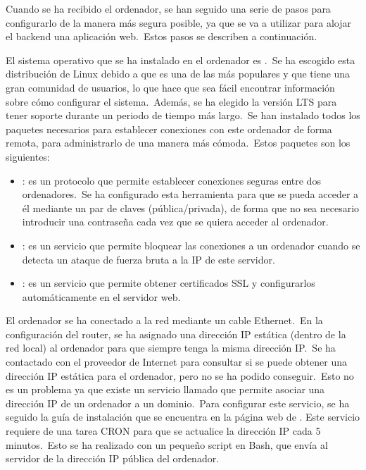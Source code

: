 Cuando se ha recibido el ordenador, se han seguido una serie de pasos para configurarlo de la manera más segura posible,
ya que se va a utilizar para alojar el backend una aplicación web.\ Estos pasos se describen a continuación.

El sistema operativo que se ha instalado en el ordenador es .\ Se ha escogido esta
distribución de Linux debido a que es una de las más populares y que tiene una gran comunidad de usuarios, lo que
hace que sea fácil encontrar información sobre cómo configurar el sistema.\ Además, se ha elegido la versión LTS para
tener soporte durante un periodo de tiempo más largo.\ Se han instalado todos los paquetes necesarios para
establecer conexiones con este ordenador de forma remota, para administrarlo de una manera más cómoda.\ Estos paquetes
son los siguientes:
\begin{itemize}
	\item {}:  es un protocolo que permite establecer conexiones seguras entre dos
	ordenadores.\ Se ha
	configurado esta herramienta para que se pueda acceder a él mediante un par de claves (pública/privada), de forma
	que no sea
	necesario introducir una contraseña cada vez que se quiera acceder al ordenador.
	\item {}: es un servicio que permite bloquear las conexiones a un ordenador cuando se detecta un
	ataque de fuerza bruta a la IP de este servidor.
	\item {}: es un servicio que permite obtener certificados SSL y configurarlos automáticamente en el
	servidor web.
\end{itemize}
\label{itm:os_packages}

El ordenador se ha conectado a la red mediante un cable Ethernet.\ En la configuración del router, se ha asignado
una dirección IP estática (dentro de la red local) al
ordenador para que siempre tenga la misma dirección IP.\ Se ha contactado con el proveedor de Internet para consultar
si se puede obtener una dirección IP estática para el ordenador, pero no se ha podido conseguir.\ Esto no es un
problema ya que existe un servicio llamado  que permite asociar
una dirección IP de un ordenador a un dominio.\ Para configurar este servicio, se ha seguido la guía de
instalación que se encuentra en la página web de . %
Este servicio requiere de una tarea CRON para que se actualice la dirección IP cada 5 minutos.\ Esto se ha realizado con
un pequeño script en Bash, que envía al servidor de  la dirección IP pública del ordenador.

